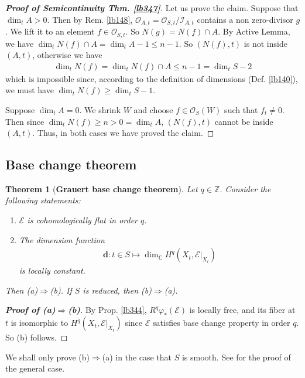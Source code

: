 \documentclass[12pt,b5paper,notitlepage]{report}
\theoremstyle{definition}
\theoremstyle{plain}
\newtheorem{thm}[df]{Theorem}
\newcommand{\scr}{\mathscr}
\newcommand{\mbf}{\mathbf}
\newcommand{\Cbb}{\mathbb C}
\newcommand{\Zbb}{\mathbb Z}
\numberwithin{equation}{section}
\begin{document}
\begin{proof}[\textbf{Proof of Semicontinuity Thm. \ref{lb347}}]
Let us prove the claim. Suppose that $\dim_t A>0$. Then by Rem. \ref{lb148}, $\scr O_{A,t}=\scr O_{S,t}/\scr I_{A,t}$ contains a non zero-divisor $g$. We lift it to an element $f\in\scr O_{S,t}$.  So $N(g)=N(f)\cap A$. By Active Lemma, we have $\dim_t N(f)\cap A=\dim_t A-1\leq n-1$. So $(N(f),t)$ is not inside $(A,t)$, otherwise we have
\begin{align*}
\dim_t N(f)=\dim_t N(f)\cap A\leq n-1=\dim_t S-2
\end{align*}
which is impossible since, according to the definition of dimensions (Def. \ref{lb140}), we must have $\dim_t N(f)\geq\dim_t S-1$. 


Suppose $\dim_t A=0$. We shrink $W$ and choose $f\in\scr O_S(W)$ such that $f_t\neq 0$. Then since $\dim_t N(f)\geq n>0=\dim_t A$, $(N(f),t)$ cannot be inside $(A,t)$. Thus, in both cases we have proved the claim.
\end{proof}




\subsection{Base change theorem}



\begin{thm}[\textbf{Grauert base change theorem}]   \label{lb355}
Let $q\in\Zbb$. Consider the following statements:
\begin{enumerate}[label=(\alph*)]
\item $\scr E$ is cohomologically flat in order $q$.
\item The dimension function
\begin{align}
\mbf d:t\in S\mapsto \dim_\Cbb H^q(X_t,\scr E|_{X_t})  \label{eq182}
\end{align}
is locally constant.
\end{enumerate}
Then (a)$\Rightarrow$(b). If $S$ is reduced, then (b)$\Rightarrow$(a).
\end{thm}


\begin{proof}[\textbf{Proof of (a)$\Rightarrow$(b)}]
By Prop. \ref{lb344}, $R^q\varphi_*(\scr E)$ is locally free, and its fiber at $t$ is isomorphic to $H^q(X_t,\scr E|_{X_t})$ since $\scr E$ satisfies base change property in order $q$. So (b) follows.
\end{proof}

We shall only prove (b)$\Rightarrow$(a) in the case that $S$ is smooth. See \cite[Sec. III.4]{BS} for the proof of the general case.
\end{document}
